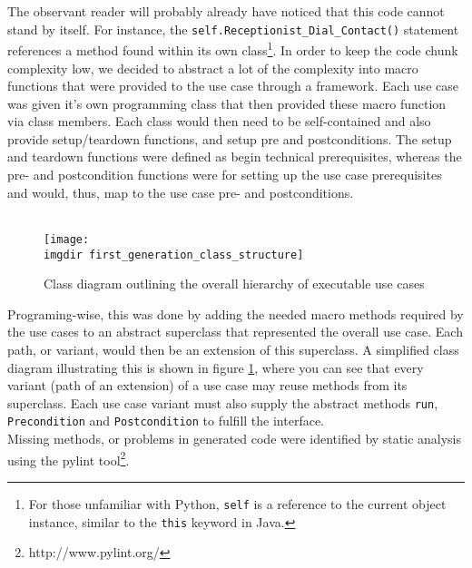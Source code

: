 \noindent
The observant reader will probably already have noticed that this code cannot stand by itself. For instance, the \texttt{self.Receptionist\_Dial\_Contact()} statement references a method found within its own class\footnote{For those unfamiliar with Python, \texttt{self} is a reference to the current object instance, similar to the \texttt{this} keyword in Java.}. In order to keep the code chunk complexity low, we decided to abstract a lot of the complexity into macro functions that were provided to the use case through a framework. Each use case was given it's own programming class that then provided these macro function via class members. Each class would then need to be self-contained and also provide setup/teardown functions, and setup pre and postconditions. The setup and teardown functions were defined as begin technical prerequisites, whereas the pre- and postcondition functions were for setting up the use case prerequisites and would, thus, map to the use case pre- and postconditions.\\\\
\begin{figure}[!h]
\centering
\texttt{[image: \\imgdir first\_generation\_class\_structure]}
\caption{Class diagram outlining the overall hierarchy of executable use cases}
\label{fig:first_generation_class_structure}
\end{figure}
Programing-wise, this was done by adding the needed macro methods required by the use cases to an abstract superclass that represented the overall use case. Each path, or variant, would then be an extension of this superclass. A simplified class diagram illustrating this is shown in figure \ref{fig:first_generation_class_structure}, where you can see that every variant (path of an extension) of a use case may reuse methods from its superclass. Each use case variant must also supply the abstract methods \texttt{run}, \texttt{Precondition} and \texttt{Postcondition} to fulfill the interface.\\
Missing methods, or problems in generated code were identified by static analysis using the pylint tool\footnote{http://www.pylint.org/}.
\newpage
